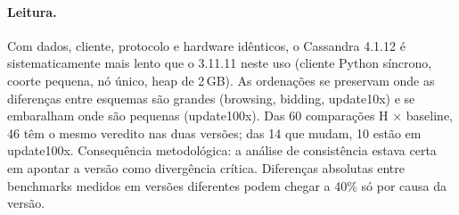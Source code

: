 \paragraph{Leitura.} Com dados, cliente, protocolo e hardware idênticos, o Cassandra 4.1.12 é sistematicamente mais lento que o 3.11.11 neste uso (cliente Python síncrono, coorte pequena, nó único, heap de 2\,GB). As ordenações se preservam onde as diferenças entre esquemas são grandes (browsing, bidding, update10x) e se embaralham onde são pequenas (update100x). Das 60 comparações H $\times$ baseline, 46 têm o mesmo veredito nas duas versões; das 14 que mudam, 10 estão em update100x. Consequência metodológica: a análise de consistência estava certa em apontar a versão como divergência crítica. Diferenças absolutas entre benchmarks medidos em versões diferentes podem chegar a 40\% só por causa da versão.
